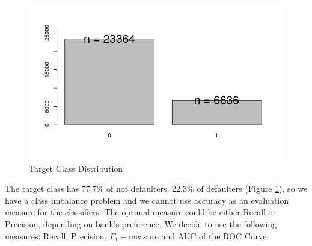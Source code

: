 \documentclass[fleqn,10pt]{SelfArx} %
\begin{document}
	\begin{figure}[h]
	\includegraphics[width=\linewidth]{class.png}
	\caption{Target Class Distribution}
	\label{fig:class}
	\end{figure}

The target class has 77.7\% of not defaulters, 22.3\% of defaulters (Figure \ref{fig:class}), so we have a class imbalance problem and we cannot use accuracy as an evaluation measure for the classifiers.
The optimal measure could be either Recall or Precision, depending on bank's preference.
We decide to use the following measures: Recall, Precision, $F_1-$measure and AUC of the ROC Curve.


\begin{table}[h]
\caption{Evaluation using Holdout and all attributes}
\label{table:holdout}
\end{table}
\end{document}
